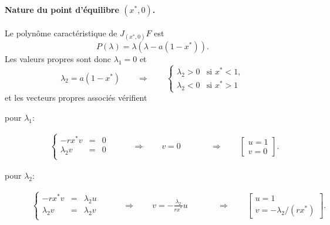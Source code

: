 \paragraph*{Nature du point d'équilibre $(x^*, 0)$.}
Le polynôme caractéristique de $J_{(x^*, 0)}F$ est
$$
P(\lambda) = \lambda (\lambda - a (1 - x^*)).
$$
Les valeurs propres sont donc $\lambda_1 = 0$ et 
$$
\lambda_2 = a (1 - x^*) 
\qquad \Rightarrow \qquad 
\left\{\begin{array}{ll} 
  \lambda_2 > 0 & \text{si } x^* < 1, \\
  \lambda_2 < 0 & \text{si } x^* > 1
\end{array} \right.
$$
et les vecteurs propres associés vérifient 
\begin{description}
  \item[pour $\lambda_1$:] 
  \begin{align*}
  \left\{\begin{array}{rcl}
      -r x^* v & = & 0 \\
      \lambda_2 v & = & 0 \\
    \end{array}\right.
    \qquad & \Rightarrow \qquad 
    v = 0 &
    \qquad & \Rightarrow \qquad 
    \left[\begin{array}{c} u=1 \\ v=0 \end{array}\right].
    \end{align*}
  \item[pour $\lambda_2$:]
    \begin{align*}
      \left\{\begin{array}{rcl}
          -r x^* v & = & \lambda_2 u \\
          \lambda_2 v & = & \lambda_2 v \\
        \end{array}\right.
        \qquad & \Rightarrow \qquad 
        v = - \frac{\lambda_2}{rx^*} u &
        \qquad & \Rightarrow \qquad 
        \left[\begin{array}{l} u=1 \\ v=-\lambda_2/(rx^*) \end{array}\right].
    \end{align*}  
\end{description}

